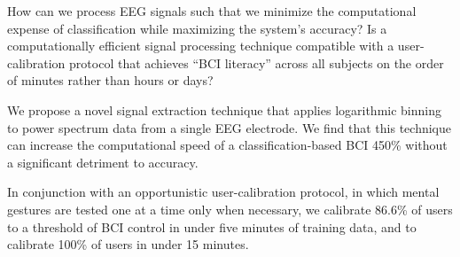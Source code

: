 How can we process EEG signals such that we minimize the computational expense of classification while maximizing the system's accuracy? Is a computationally efficient signal processing technique compatible with a user-calibration protocol that achieves ``BCI literacy'' across all subjects on the order of minutes rather than hours or days?

We propose a novel signal extraction technique that applies logarithmic binning to power spectrum data from a single EEG electrode. We find that this technique can increase the computational speed of a classification-based BCI 450\% without a significant detriment to accuracy.

In conjunction with an opportunistic user-calibration protocol, in which mental gestures are tested one at a time only when necessary, we calibrate 86.6\% of users to a threshold of BCI control in under five minutes of training data, and to calibrate 100\% of users in under 15 minutes. 